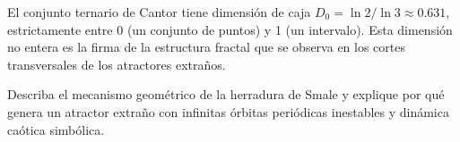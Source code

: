 \documentclass[11pt,a4paper]{article}
\newenvironment{solucion}[1][Solución Detallada]{%
    \vspace{1.5mm}%
    \noindent{\large\textbf{Solución:}}\par\vspace{1.5mm}%
}{%
    \par\vspace{3mm}%
}
\newenvironment{conclusion}[1][Interpretación Dinámica y Conclusión]{%
    \vspace{2mm}%
    \noindent{\large\textbf{Conclusión:}}\par\vspace{1.5mm}%
}{%
    \par\vspace{3mm}%
}
\begin{document}
\begin{solucion}
\begin{center}
\end{center}

\end{solucion}

\begin{conclusion}
El conjunto ternario de Cantor tiene dimensión de caja $D_0 = \ln 2/\ln 3 \approx 0.631$, estrictamente entre 0 (un conjunto de puntos) y 1 (un intervalo). Esta dimensión no entera es la firma de la estructura fractal que se observa en los cortes transversales de los atractores extraños.
\end{conclusion}

\vspace{3mm}

\begin{problema}[Problema 5.2]
Describa el mecanismo geométrico de la herradura de Smale y explique por qué genera un atractor extraño con infinitas órbitas periódicas inestables y dinámica caótica simbólica.
\end{problema}
\end{document}
